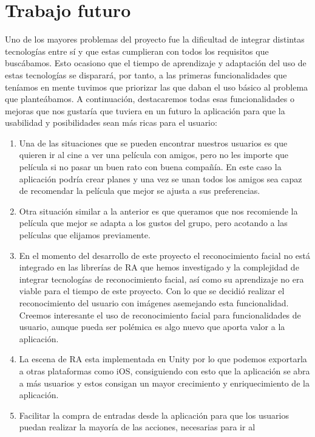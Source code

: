 \section{Trabajo futuro}
\label{makereference5.2}
Uno de los mayores problemas del proyecto fue la dificultad de integrar
 distintas tecnologías entre sí y que estas cumplieran con todos los requisitos
 que buscábamos. Esto ocasiono que el tiempo de aprendizaje y adaptación del uso
 de estas tecnologías se disparará, por tanto, a las primeras funcionalidades que
 teníamos en mente tuvimos que priorizar las que daban el uso básico al problema
 que planteábamos.
A continuación, destacaremos todas esas funcionalidades o mejoras que nos
 gustaría que tuviera en un futuro la aplicación para que la usabilidad y
 posibilidades sean más ricas para el usuario:
\begin{enumerate}
    \item Una de las situaciones que se pueden encontrar nuestros usuarios es
     que quieren ir al cine a ver una película con amigos, pero no les importe
     que película si no pasar un buen rato con buena compañía. En este caso la
     aplicación podría crear planes y una vez se unan todos los amigos sea capaz
     de recomendar la película que mejor se ajusta a sus preferencias.
    \item Otra situación similar a la anterior es que queramos que nos
     recomiende la película que mejor se adapta a los gustos del grupo, pero
     acotando a las películas que elijamos previamente.
    \item En el momento del desarrollo de este proyecto el reconocimiento facial
     no está integrado en las librerías de RA que hemos investigado y la
     complejidad de integrar tecnologías de reconocimiento facial, así como su
     aprendizaje no era viable para el tiempo de este proyecto.
    Con lo que se decidió realizar el reconocimiento del usuario con imágenes
     asemejando esta funcionalidad. Creemos interesante el uso de
     reconocimiento facial para funcionalidades de usuario, aunque pueda ser
     polémica es algo nuevo que aporta valor a la aplicación.
    \item La escena de RA esta implementada en Unity por lo que podemos
     exportarla a otras plataformas como iOS, consiguiendo con esto que la
     aplicación se abra a más usuarios y estos consigan un mayor crecimiento y
     enriquecimiento de la aplicación.
    \item Facilitar la compra de entradas desde la aplicación para que los
     usuarios puedan realizar la mayoría de las acciones, necesarias para ir al

\end{enumerate}

